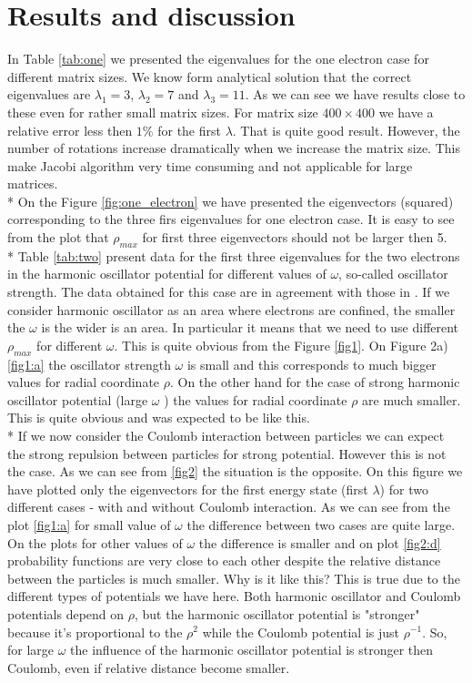 \documentclass[10pt]{article}
\begin{document}
\section{Results and discussion}
In Table \ref{tab:one} we presented the eigenvalues for the one electron case for different matrix sizes. We know form analytical solution that the correct eigenvalues are $ \lambda_{1}=3 $, $ \lambda_{2}=7 $ and $ \lambda_{3}=11 $. As we can see we have results close to these even for rather small matrix sizes. For matrix size $ 400 \times 400 $ we have a relative error less then $ 1\% $ for the first $ \lambda $. That is quite good result. However, the number of rotations increase dramatically when we increase the matrix size. This make Jacobi algorithm very time consuming and not applicable for large matrices. \\*
On the Figure \ref{fig:one_electron} we have presented the eigenvectors (squared) corresponding to the three firs eigenvalues for one electron case. It is easy to see from the plot that $\rho_{max}$ for first three eigenvectors should not be larger then 5. \\*
Table \ref{tab:two} present data for the first three eigenvalues for the two electrons in the harmonic oscillator potential for different values of $\omega$, so-called oscillator strength. The data obtained for this case are in agreement with those in \cite{three}. If we consider harmonic oscillator as an area where electrons are confined, the smaller the $\omega$ is the wider is an area. In particular it means that we need to use different $\rho_{max}$ for different $\omega$. This is quite obvious from the Figure \ref{fig1}. On Figure 2a) \ref{fig1:a} the oscillator strength $\omega$ is small and this corresponds to much bigger values for radial coordinate $\rho$. On the other hand for the case of strong harmonic oscillator potential (large $\omega$ ) the values for radial coordinate $\rho$ are much smaller. This is quite obvious and was expected to be like this. \\*
If we now consider the Coulomb interaction between particles we can expect the strong repulsion between particles for strong potential. However this is not the case. As we can see from \ref{fig2} the situation is the opposite. On this figure we have plotted only the eigenvectors for the first energy state (first $\lambda$) for two different cases - with and without Coulomb interaction. As we can see from the plot \ref{fig1:a} for small value of $\omega$ the difference between two cases are quite large. On the plots for other values of $\omega$ the difference is smaller and on plot \ref{fig2:d} probability functions are very close to each other despite the relative distance between the particles is much smaller. Why is it like this? This is true due to the different types of potentials we have here. Both harmonic oscillator and Coulomb potentials depend on $\rho$, but the harmonic oscillator potential is "stronger" because it's proportional to the $\rho^{2}$ while the Coulomb potential is just $\rho^{-1}$. So, for large $\omega$ the influence of the harmonic oscillator potential is stronger then Coulomb, even if relative distance become smaller.
\end{document}

